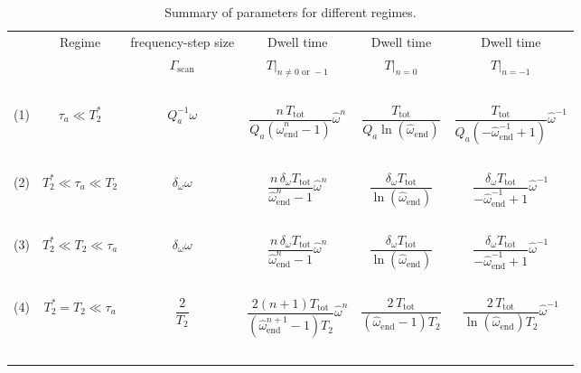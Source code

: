 \begin{table}[ht]
    \centering
    \caption{Summary of parameters for different regimes.} 
    \begin{tabular}{cccccc}
    	\hline
    	\, & Regime & frequency-step size &  Dwell time  &  Dwell time  &  Dwell time   \\
        \, &  & $\Gamma_{\mathrm{scan}}$ & $T|_{n\ne0 \text{ or } -1}$ & $T|_{n=0}$ & $T|_{n=-1}$ \\
    	\hline
        \, & &   &  &   &   \\
        (1) & $\tau_a \ll T_2^*$ & $Q_a^{-1}\omega$ 
        & $\dfrac{n \,T_{\mathrm{tot}} }{ Q_a (\hat{\omega}_{\mathrm{end}}^{n}-1) } \hat{\omega}^n$ 
        & $\dfrac{T_{\mathrm{tot}} }{ Q_a \ln(\hat{\omega}_{\mathrm{end}}) } $
        & $\dfrac{T_{\mathrm{tot}} }{ Q_a (-\hat{\omega}_{\mathrm{end}}^{-1}+1) } \hat{\omega}^{-1}$\\
        \, & &   &  &   &   \\
    	(2) & $T_2^* \ll \tau_a \ll T_2$  & $\delta_\omega \omega$ 
        & $\dfrac{n \,\delta_{\omega} T_{\mathrm{tot}} }{ \hat{\omega}_{\mathrm{end}}^{n}-1 } \hat{\omega}^n$ 
        & $\dfrac{\delta_{\omega} T_{\mathrm{tot}} }{  \ln(\hat{\omega}_{\mathrm{end}}) } $
        & $\dfrac{\delta_{\omega} T_{\mathrm{tot}} }{  -\hat{\omega}_{\mathrm{end}}^{-1}+1 } \hat{\omega}^{-1}$  \\
        \, & &   &  &   &   \\
    	(3) & $T_2^* \ll T_2 \ll \tau_a$ & $\delta_\omega \omega$
        & $\dfrac{n \,\delta_{\omega} T_{\mathrm{tot}} }{ \hat{\omega}_{\mathrm{end}}^{n}-1 } \hat{\omega}^n$ 
        & $\dfrac{\delta_{\omega} T_{\mathrm{tot}} }{  \ln(\hat{\omega}_{\mathrm{end}}) } $
        & $\dfrac{\delta_{\omega} T_{\mathrm{tot}} }{  -\hat{\omega}_{\mathrm{end}}^{-1}+1 } \hat{\omega}^{-1}$\\
        \, & &   &  &   &   \\
    	(4) & $T_2^*=T_2 \ll \tau_a$ & $\dfrac{2}{T_2}$ 
        & $\dfrac{2(n+1) T_{\mathrm{tot}}}{(\hat{\omega}_{\mathrm{end}}^{n+1}-1) T_2} \hat{\omega}^n$ 
        & $\dfrac{2\,T_{\mathrm{tot}}}{(\hat{\omega}_{\mathrm{end}}-1) T_2  }$ 
        & $ \dfrac{2\,T_{\mathrm{tot}}}{\ln{(\hat{\omega}_{\mathrm{end}})} T_2}   \hat{\omega}^{-1}      $ \\
        \, & &   &  &   &   \\
        \hline
    \end{tabular}
    \label{tab:summary_of_scanning}
\end{table}

